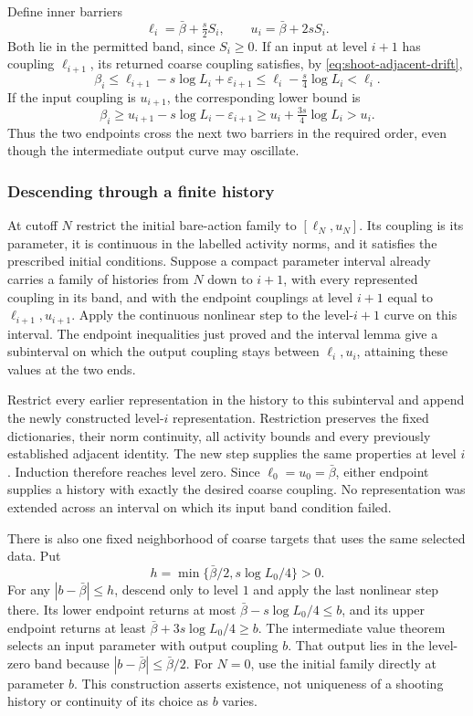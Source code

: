 Define inner barriers
\[
 \ell_i=\bar\beta+\tfrac{s}{2}S_i,
 \qquad u_i=\bar\beta+2sS_i.
\]
Both lie in the permitted band, since $S_i\ge0$. If an input at
level $i+1$ has coupling $\ell_{i+1}$, its returned coarse coupling
satisfies, by \eqref{eq:shoot-adjacent-drift},
\[
 \beta_i\le\ell_{i+1}-s\log L_i+\varepsilon_{i+1}
             \le\ell_i-\tfrac{s}{4}\log L_i<\ell_i.
\]
If the input coupling is $u_{i+1}$, the corresponding lower bound is
\[
 \beta_i\ge u_{i+1}-s\log L_i-\varepsilon_{i+1}
             \ge u_i+\tfrac{3s}{4}\log L_i>u_i.
\]
Thus the two endpoints cross the next two barriers in the required
order, even though the intermediate output curve may oscillate.

\subsubsection{Descending through a finite history}
At cutoff $N$ restrict the initial bare-action family to
$[\ell_N,u_N]$. Its coupling is its parameter, it is continuous in the
labelled activity norms, and it satisfies the prescribed initial
conditions. Suppose a compact parameter interval already carries a
family of histories from $N$ down to $i+1$, with every represented
coupling in its band, and with the endpoint couplings at level $i+1$
equal to $\ell_{i+1},u_{i+1}$. Apply the continuous nonlinear step to
the level-$i+1$ curve on this interval. The endpoint inequalities just
proved and the interval lemma give a subinterval on which the output
coupling stays between $\ell_i,u_i$, attaining these values at the
two ends.

Restrict every earlier representation in the history to this
subinterval and append the newly constructed level-$i$ representation.
Restriction preserves the fixed dictionaries, their norm continuity,
all activity bounds and every previously established adjacent identity.
The new step supplies the same properties at level $i$. Induction
therefore reaches level zero. Since $\ell_0=u_0=\bar\beta$, either
endpoint supplies a history with exactly the desired coarse coupling.
No representation was extended across an interval on which its input
band condition failed.

There is also one fixed neighborhood of coarse targets that uses the
same selected data. Put
\[
 h=\min\{\bar\beta/2,s\log L_0/4\}>0.
\]
For any $|b-\bar\beta|\le h$, descend only to level $1$ and apply the
last nonlinear step there. Its lower endpoint returns at most
$\bar\beta-s\log L_0/4\le b$, and its upper endpoint returns at
least $\bar\beta+3s\log L_0/4\ge b$. The intermediate value theorem
selects an input parameter with output coupling $b$. That output lies
in the level-zero band because $|b-\bar\beta|\le\bar\beta/2$.
For $N=0$, use the initial family directly at parameter $b$.
This construction asserts existence, not uniqueness of a shooting
history or continuity of its choice as $b$ varies.

